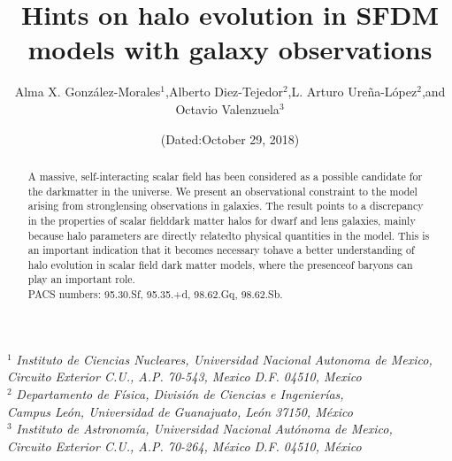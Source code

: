 \documentclass[10pt,a4paper]{article}
\title{Hints on halo evolution in SFDM models with galaxy observations}
\author{Alma X. González-Morales$^{1}$,Alberto Diez-Tejedor$^{2}$,L. Arturo Ureña-López$^{2}$,and Octavio Valenzuela$^{3}$}
\date{(Dated:October 29, 2018)}
\begin{document}
\maketitle

\begin{center}

\small{$^{1}$ \textit{Instituto  de  Ciencias  Nucleares,  Universidad  Nacional  Autonoma  de Mexico,\\ Circuito  Exterior C.U.,  A.P.  70-543,  Mexico  D.F.  04510,  Mexico}}\\
\small{$^{2}$ \textit{Departamento  de  Física,  División  de  Ciencias  e  Ingenierías,\\ Campus  León,  Universidad  de  Guanajuato,  León  37150,  México}}\\
\small{$^{3}$ \textit{Instituto  de  Astronomía,  Universidad  Nacional  Autónoma  de  Mexico,\\ Circuito  Exterior  C.U.,  A.P.  70-264,  México  D.F.  04510,  México}}\\



\begin{abstract}\vspace{1em}
A massive, self-interacting scalar field has been considered as a possible candidate for the darkmatter in the universe.  We present an observational constraint to the model arising from stronglensing observations in galaxies.  The result points to a discrepancy in the properties of scalar fielddark matter halos for dwarf and lens galaxies, mainly because halo parameters are directly relatedto physical quantities in the model.  This is an important indication that it becomes necessary tohave a better understanding of halo evolution in scalar field dark matter models, where the presenceof baryons can play an important role.\\
PACS numbers:  95.30.Sf, 95.35.+d, 98.62.Gq, 98.62.Sb.
\end{abstract}

\end{center}
\end{document}
